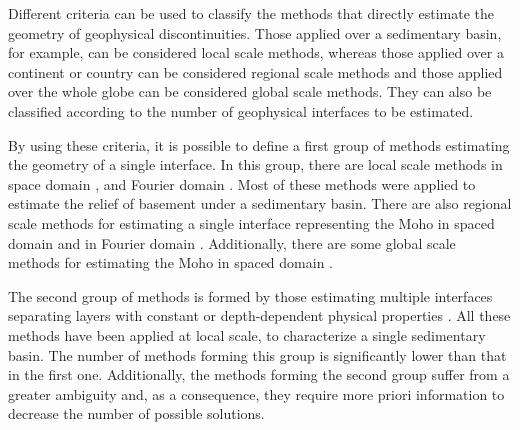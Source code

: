 \documentclass[manuscript]{geophysics}
\begin{document}
Different criteria can be used to classify the methods that directly estimate
the geometry of geophysical discontinuities.
Those applied over a sedimentary basin, for example, can be considered local scale methods,
whereas those applied over a continent or country can be considered regional scale methods
and those applied over the whole globe can be considered global scale methods.
They can also be classified according to the number of geophysical interfaces
to be estimated.

By using these criteria, it is possible to define a first group of methods
estimating the geometry of a single interface.
In this group, there are local scale methods in space domain
\citep[e.g.,][]{bott1960, tanner1967, cordell-henderson1968, dyrelius-vogel1972, pedersen1977,
pilkington-crossley1986, richardson-macinnes1989, barbosa-etal1997, 
barbosa-etal1999, barbosa-etal1999b, silva-etal2006, pilkington2006, 
chakravarthi-sundararajan2007, martins-etal2010, silva-etal2010, lima-etal2011, 
martins-etal2011, barnes-barraud2012, silva-etal2014, silva-santos2017},
and Fourier domain
\citep[e.g.,][]{oldenburg1974, granser1987, reamer-ferguson1989, guspi1993}.
Most of these methods were applied to estimate the relief of basement under
a sedimentary basin.
There are also regional scale methods for estimating a single interface 
representing the Moho in spaced domain 
\citep[e.g.,][]{shin-etal2009, bagherbandi-eshagh2012, barzaghi-biagi2014, sampietro2015, uieda-barbosa2017} and in Fourier domain 
\citep[e.g.,][]{braitenberg-etal1997, braitenberg-zadro1999, vandermeijde-etal2013}.
Additionally, there are some global scale methods for estimating the Moho
in spaced domain
\citep[e.g.,][]{sunkel1985, sjoberg2009}.

The second group of methods is formed by those estimating multiple interfaces
separating layers with constant or depth-dependent physical properties 
\citep[e.g.,][]{pilkington-crossley1986b, gallardo-etal2005, camacho-etal2011, 
salem-etal2014}.
All these methods have been applied at local scale, to characterize a single 
sedimentary basin.
The number of methods forming this group is significantly lower than that
in the first one.
Additionally, the methods forming the second group suffer from a greater 
ambiguity and, as a consequence, they require more priori information to
decrease the number of possible solutions.
\end{document}
